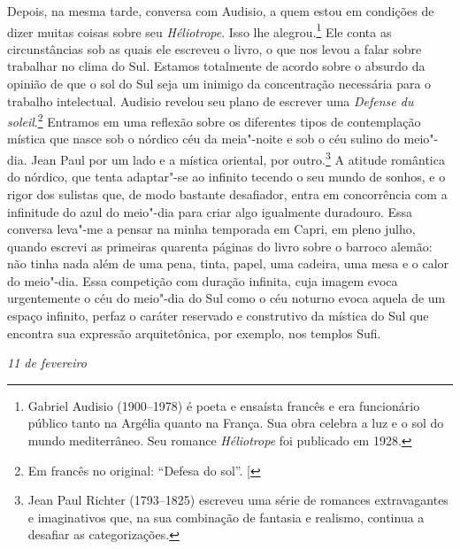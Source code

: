 Depois, na mesma tarde, conversa com Audisio, a quem estou em
condições de dizer muitas coisas sobre seu \emph{Héliotrope}. Isso lhe
alegrou.\footnote{Gabriel Audisio (1900--1978) é poeta e ensaísta
  francês e era funcionário público tanto na Argélia quanto na França.
  Sua obra celebra a luz e o sol do mundo mediterrâneo. Seu romance
  \emph{Héliotrope} foi publicado em 1928. \versal{[N.~O.]}} Ele conta as circunstâncias
sob as quais ele escreveu o livro, o que nos levou a falar sobre
trabalhar no clima do Sul. Estamos totalmente de acordo sobre o absurdo
da opinião de que o sol do Sul seja um inimigo da concentração
necessária para o trabalho intelectual. Audisio revelou seu plano
de escrever uma \emph{Defense du soleil}.\footnote{Em francês no original: ``Defesa do sol''. {[}\versal{N.~T.}{]}} Entramos em uma reflexão sobre os
diferentes tipos de contemplação mística que nasce sob o nórdico céu da
meia"-noite e sob o céu sulino do meio"-dia. Jean Paul por um lado e a
mística oriental, por outro.\footnote{Jean Paul Richter (1793--1825)
  escreveu uma série de romances extravagantes e imaginativos que, na sua
  combinação de fantasia e realismo, continua a desafiar as
  categorizações. \versal{[N.~O.]}} A atitude romântica do nórdico, que tenta adaptar"-se
ao infinito tecendo o seu mundo de sonhos, e o rigor dos sulistas que,
de modo bastante desafiador, entra em concorrência com a infinitude do
azul do meio"-dia para criar algo igualmente duradouro. Essa conversa
leva"-me a pensar na minha temporada em Capri, em pleno julho, quando
escrevi as primeiras quarenta páginas do livro sobre o barroco alemão:
não tinha nada além de uma pena, tinta, papel, uma cadeira, uma mesa e o
calor do meio"-dia. Essa competição com duração infinita, cuja imagem
evoca urgentemente o céu do meio"-dia do Sul como o céu noturno evoca
aquela de um espaço infinito, perfaz o caráter reservado e construtivo
da mística do Sul que encontra sua expressão arquitetônica, por exemplo,
nos templos Sufi.

\begin{flushright}
\emph{11 de fevereiro}
\end{flushright}

